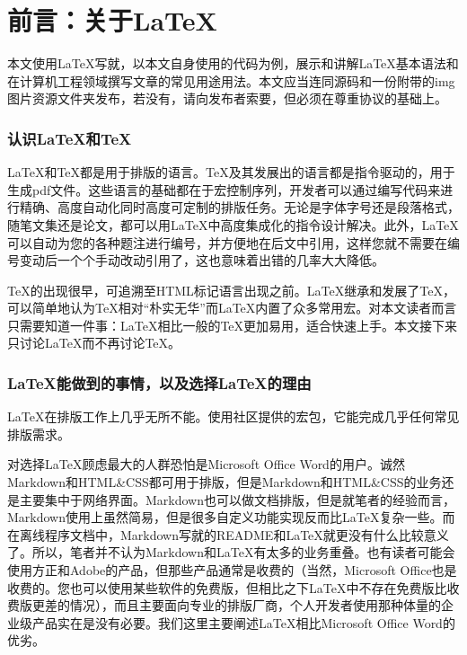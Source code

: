 
\part{前言：关于\LaTeX}
本文使用\LaTeX 写就，以本文自身使用的代码为例，展示和讲解\LaTeX 基本语法和在计算机工程领域撰写文章的常见用途用法。本文应当连同源码和一份附带的img图片资源文件夹发布，若没有，请向发布者索要，但必须在尊重协议的基础上。

\section{认识\LaTeX 和\TeX}

\LaTeX 和\TeX 都是用于排版的语言。\TeX 及其发展出的语言都是指令驱动的，用于生成pdf文件。这些语言的基础都在于宏控制序列，开发者可以通过编写代码来进行精确、高度自动化同时高度可定制的排版任务。无论是字体字号还是段落格式，随笔文集还是论文，都可以用\LaTeX 中高度集成化的指令设计解决。此外，\LaTeX 可以自动为您的各种题注进行编号，并方便地在后文中引用，这样您就不需要在编号变动后一个个手动改动引用了，这也意味着出错的几率大大降低。

\TeX 的出现很早，可追溯至HTML标记语言出现之前。\LaTeX 继承和发展了\TeX，可以简单地认为\TeX 相对“朴实无华”而\LaTeX 内置了众多常用宏。对本文读者而言只需要知道一件事：\LaTeX 相比一般的\TeX 更加易用，适合快速上手。本文接下来只讨论\LaTeX 而不再讨论\TeX。

\section{\LaTeX 能做到的事情，以及选择\LaTeX 的理由}

\LaTeX 在排版工作上几乎无所不能。使用社区提供的宏包，它能完成几乎任何常见排版需求。

对选择\LaTeX 顾虑最大的人群恐怕是Microsoft Office Word的用户。诚然Markdown和HTML\&CSS都可用于排版，但是Markdown和HTML\&CSS的业务还是主要集中于网络界面。Markdown也可以做文档排版，但是就笔者的经验而言，Markdown使用上虽然简易，但是很多自定义功能实现反而比\LaTeX 复杂一些。而在离线程序文档中，Markdown写就的README和\LaTeX 就更没有什么比较意义了。所以，笔者并不认为Markdown和\LaTeX 有太多的业务重叠。也有读者可能会使用方正和Adobe的产品，但那些产品通常是收费的（当然，Microsoft Office也是收费的。您也可以使用某些软件的免费版，但相比之下\LaTeX 中不存在免费版比收费版更差的情况），而且主要面向专业的排版厂商，个人开发者使用那种体量的企业级产品实在是没有必要。我们这里主要阐述\LaTeX 相比Microsoft Office Word的优劣。

